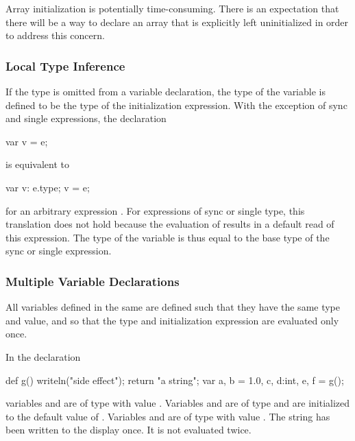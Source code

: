 \begin{openissue}
Array initialization is potentially time-consuming.  There is an
expectation that there will be a way to declare an array that is
explicitly left uninitialized in order to address this concern.
\end{openissue}

\subsubsection{Local Type Inference}
\label{Local_Type_Inference}

If the type is omitted from a variable declaration, the type of the
variable is defined to be the type of the initialization expression.
With the exception of sync and single expressions, the declaration
\begin{chapel}
var v = e;
\end{chapel}
is equivalent to
\begin{chapel}
var v: e.type;
v = e;
\end{chapel}
for an arbitrary expression .  For expressions of sync or
single type, this translation does not hold because the evaluation
of  results in a default read of this expression.  The type of
the variable is thus equal to the base type of the sync or single
expression.

\subsubsection{Multiple Variable Declarations}
\label{Multiple_Variable_Declarations}

All variables defined in the same  are defined
such that they have the same type and value, and so that the type and
initialization expression are evaluated only once.

\begin{example}
In the declaration
\begin{chapel}
def g() { writeln("side effect"); return "a string"; }
var a, b = 1.0, c, d:int, e, f = g();
\end{chapel}
variables  and  are of type  with
value .  Variables  and  are of
type  and are initialized to the default value of .
Variables  and  are of type  with
value .  The string  has been
written to the display once.  It is not evaluated twice.
\end{example}

